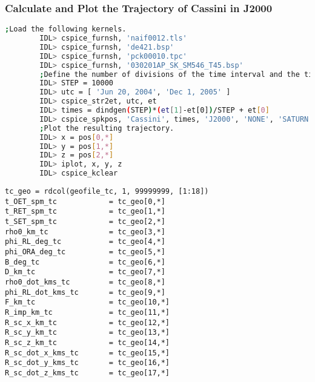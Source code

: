 \documentclass[crop=false,class=book]{standalone}
\begin{document}
        \subsubsection{Calculate and Plot the Trajectory of Cassini in J2000}
        \begin{lstlisting}[language=bash,basicstyle=\footnotesize] 
        ;Load the following kernels.
        IDL> cspice_furnsh, 'naif0012.tls'
        IDL> cspice_furnsh, 'de421.bsp'
        IDL> cspice_furnsh, 'pck00010.tpc'
        IDL> cspice_furnsh, '030201AP_SK_SM546_T45.bsp' 
        ;Define the number of divisions of the time interval and the time interval.
        IDL> STEP = 10000
        IDL> utc = [ 'Jun 20, 2004', 'Dec 1, 2005' ]
        IDL> cspice_str2et, utc, et
        IDL> times = dindgen(STEP)*(et[1]-et[0])/STEP + et[0]
        IDL> cspice_spkpos, 'Cassini', times, 'J2000', 'NONE', 'SATURN BARYCENTER', pos, ltime
        ;Plot the resulting trajectory.
        IDL> x = pos[0,*]
        IDL> y = pos[1,*]
        IDL> z = pos[2,*]
        IDL> iplot, x, y, z
        IDL> cspice_kclear
        \end{lstlisting}
        \begin{lstlisting}[language=IDL]
tc_geo = rdcol(geofile_tc, 1, 99999999, [1:18])
t_OET_spm_tc            = tc_geo[0,*]
t_RET_spm_tc            = tc_geo[1,*]
t_SET_spm_tc            = tc_geo[2,*]
rho0_km_tc              = tc_geo[3,*]
phi_RL_deg_tc           = tc_geo[4,*]
phi_ORA_deg_tc          = tc_geo[5,*]
B_deg_tc                = tc_geo[6,*]
D_km_tc                 = tc_geo[7,*]
rho0_dot_kms_tc         = tc_geo[8,*]
phi_RL_dot_kms_tc       = tc_geo[9,*]
F_km_tc                 = tc_geo[10,*]
R_imp_km_tc             = tc_geo[11,*]
R_sc_x_km_tc            = tc_geo[12,*]
R_sc_y_km_tc            = tc_geo[13,*]
R_sc_z_km_tc            = tc_geo[14,*]
R_sc_dot_x_kms_tc       = tc_geo[15,*]
R_sc_dot_y_kms_tc       = tc_geo[16,*]
R_sc_dot_z_kms_tc       = tc_geo[17,*]
\end{lstlisting}
\end{document}
